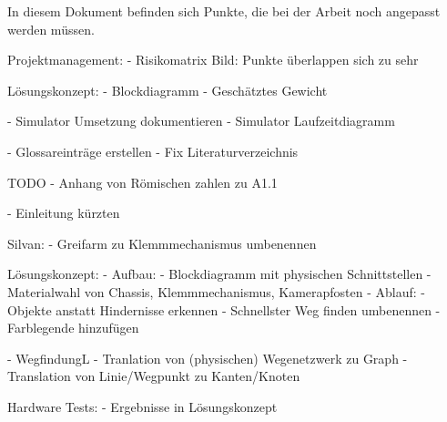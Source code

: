 
In diesem Dokument befinden sich Punkte, die bei der Arbeit noch angepasst werden müssen.

Projektmanagement:
- Risikomatrix Bild: Punkte überlappen sich zu sehr

Lösungskonzept:
- Blockdiagramm
- Geschätztes Gewicht

- Simulator Umsetzung dokumentieren
- Simulator Laufzeitdiagramm


- Glossareinträge erstellen
- Fix Literaturverzeichnis

TODO
- Anhang von Römischen zahlen zu A1.1

- Einleitung kürzten

Silvan:
- Greifarm zu Klemmmechanismus umbenennen

Lösungskonzept:
- Aufbau:
  - Blockdiagramm mit physischen Schnittstellen
  - Materialwahl von Chassis, Klemmmechanismus, Kamerapfosten
- Ablauf:
  - Objekte anstatt Hindernisse erkennen
  - Schnellster Weg finden umbenennen
  - Farblegende hinzufügen

- WegfindungL
  - Tranlation von (physischen) Wegenetzwerk zu Graph
  - Translation von Linie/Wegpunkt zu Kanten/Knoten


Hardware Tests:
- Ergebnisse in Lösungskonzept
